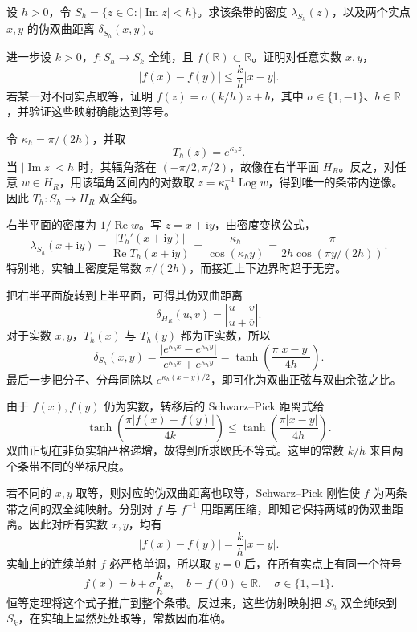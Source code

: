 \begin{exercise}\label{b3:ex:06-7}
设 \(h>0\)，令 \(S_h=\{z\in\mathbb C:|\operatorname{Im}z|<h\}\)。求该条带的密度 \(\lambda_{S_h}(z)\)，以及两个实点 \(x,y\) 的伪双曲距离 \(\delta_{S_h}(x,y)\)。

\ProseParagraphBreak

进一步设 \(k>0\)，\(f:S_h\rightarrow S_k\) 全纯，且 \(f(\mathbb R)\subset\mathbb R\)。证明对任意实数 \(x,y\)，
\[
 |f(x)-f(y)|\le\frac{k}{h}|x-y|.
\]
若某一对不同实点取等，证明
\(f(z)=\sigma(k/h)z+b\)，其中 \(\sigma\in\{1,-1\}\)、\(b\in\mathbb R\)，并验证这些映射确能达到等号。
\end{exercise}
\begin{solution}
令 \(\kappa_h=\pi/(2h)\)，并取
\[
 T_h(z)=e^{\kappa_h z}.
\]
当 \(|\operatorname{Im}z|<h\) 时，其辐角落在 \((-\pi/2,\pi/2)\)，故像在右半平面 \(H_R\)。反之，对任意 \(w\in H_R\)，用该辐角区间内的对数取
\(z=\kappa_h^{-1}\operatorname{Log}w\)，得到唯一的条带内逆像。因此 \(T_h:S_h\to H_R\) 双全纯。

右半平面的密度为 \(1/\operatorname{Re}w\)。写 \(z=x+\mathrm{i}y\)，由密度变换公式，
\[
 \lambda_{S_h}(x+\mathrm{i}y)
 =\frac{|T_h'(x+\mathrm{i}y)|}{\operatorname{Re}T_h(x+\mathrm{i}y)}
 =\frac{\kappa_h}{\cos(\kappa_h y)}
 =\frac{\pi}{2h\cos(\pi y/(2h))}.
\]
特别地，实轴上密度是常数 \(\pi/(2h)\)，而接近上下边界时趋于无穷。

把右半平面旋转到上半平面，可得其伪双曲距离
\[
 \delta_{H_R}(u,v)=\left|\frac{u-v}{u+\overline v}\right|.
\]
对于实数 \(x,y\)，\(T_h(x)\) 与 \(T_h(y)\) 都为正实数，所以
\[
 \delta_{S_h}(x,y)
 =\frac{|e^{\kappa_h x}-e^{\kappa_h y}|}
        {e^{\kappa_h x}+e^{\kappa_h y}}
 =\tanh\left(\frac{\pi|x-y|}{4h}\right).
\]
最后一步把分子、分母同除以
\(e^{\kappa_h(x+y)/2}\)，即可化为双曲正弦与双曲余弦之比。

由于 \(f(x),f(y)\) 仍为实数，转移后的 Schwarz--Pick 距离式给
\[
 \tanh\left(\frac{\pi|f(x)-f(y)|}{4k}\right)
 \le
 \tanh\left(\frac{\pi|x-y|}{4h}\right).
\]
双曲正切在非负实轴严格递增，故得到所求欧氏不等式。这里的常数 \(k/h\) 来自两个条带不同的坐标尺度。

若不同的 \(x,y\) 取等，则对应的伪双曲距离也取等，Schwarz--Pick 刚性使 \(f\) 为两条带之间的双全纯映射。分别对 \(f\) 与 \(f^{-1}\) 用距离压缩，即知它保持两域的伪双曲距离。因此对所有实数 \(x,y\)，均有
\[
 |f(x)-f(y)|=\frac{k}{h}|x-y|.
\]
实轴上的连续单射 \(f\) 必严格单调，所以取 \(y=0\) 后，在所有实点上有同一个符号
\[
 f(x)=b+\sigma\frac{k}{h}x,\quad
 b=f(0)\in\mathbb R,\quad \sigma\in\{1,-1\}.
\]
恒等定理将这个式子推广到整个条带。反过来，这些仿射映射把 \(S_h\) 双全纯映到 \(S_k\)，在实轴上显然处处取等，常数因而准确。
\end{solution}

